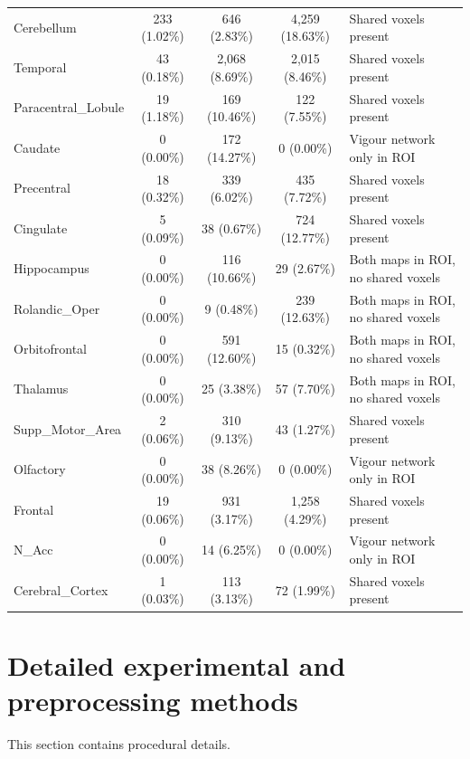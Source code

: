 \documentclass[utf8]{frontiers_suppmat}
\begin{document}
\begin{table}
\begin{tabularx}{\textwidth}{@{}lccc>{\raggedright\arraybackslash}X@{}}
    Cerebellum & 233 (1.02\%) & 646 (2.83\%) & 4,259 (18.63\%) & Shared voxels present \\
    Temporal & 43 (0.18\%) & 2,068 (8.69\%) & 2,015 (8.46\%) & Shared voxels present \\
    Paracentral\_Lobule & 19 (1.18\%) & 169 (10.46\%) & 122 (7.55\%) & Shared voxels present \\
    Caudate & 0 (0.00\%) & 172 (14.27\%) & 0 (0.00\%) & Vigour network only in ROI \\
    Precentral & 18 (0.32\%) & 339 (6.02\%) & 435 (7.72\%) & Shared voxels present \\
    Cingulate & 5 (0.09\%) & 38 (0.67\%) & 724 (12.77\%) & Shared voxels present \\
    Hippocampus & 0 (0.00\%) & 116 (10.66\%) & 29 (2.67\%) & Both maps in ROI, no shared voxels \\
    Rolandic\_Oper & 0 (0.00\%) & 9 (0.48\%) & 239 (12.63\%) & Both maps in ROI, no shared voxels \\
    Orbitofrontal & 0 (0.00\%) & 591 (12.60\%) & 15 (0.32\%) & Both maps in ROI, no shared voxels \\
    Thalamus & 0 (0.00\%) & 25 (3.38\%) & 57 (7.70\%) & Both maps in ROI, no shared voxels \\
    Supp\_Motor\_Area & 2 (0.06\%) & 310 (9.13\%) & 43 (1.27\%) & Shared voxels present \\
    Olfactory & 0 (0.00\%) & 38 (8.26\%) & 0 (0.00\%) & Vigour network only in ROI \\
    Frontal & 19 (0.06\%) & 931 (3.17\%) & 1,258 (4.29\%) & Shared voxels present \\
    N\_Acc & 0 (0.00\%) & 14 (6.25\%) & 0 (0.00\%) & Vigour network only in ROI \\
    Cerebral\_Cortex & 1 (0.03\%) & 113 (3.13\%) & 72 (1.99\%) & Shared voxels present \\
    \bottomrule
    \end{tabularx}
\end{table}



\clearpage
\FloatBarrier
\section{Detailed experimental and preprocessing methods}\label{app:methods_full}
This section contains procedural details.
\end{document}
